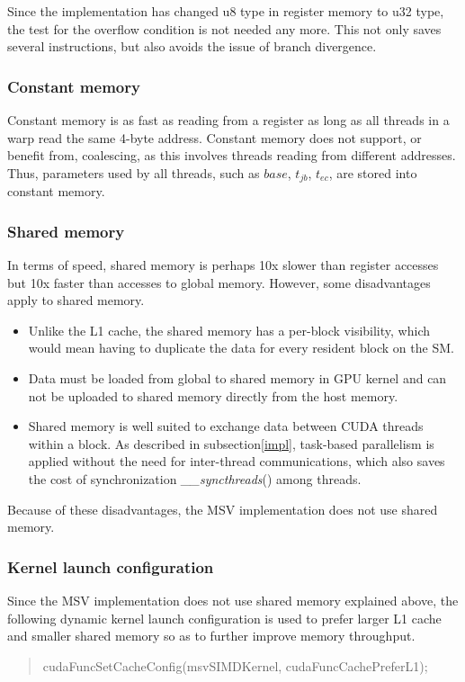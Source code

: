 Since the implementation has changed u8 type in register memory to u32 type, the test for the overflow condition is not needed any more. This not only saves several instructions, but also avoids the issue of branch divergence.

\subsubsection*{Constant memory}
\label{constant}
Constant memory is as fast as reading from a register as long as all threads in a warp read the same 4-byte address. Constant memory does not support, or benefit from, coalescing, as this involves threads reading from different addresses. Thus, parameters used by all threads, such as $base$, $t_{jb}$, $t_{ec}$, are stored into constant memory.

\subsubsection*{Shared memory}
\label{shared}
In terms of speed, shared memory is perhaps 10x slower than register accesses but 10x faster than accesses to global memory. However, some disadvantages apply to shared memory.

\begin{itemize}
 \item Unlike the L1 cache, the shared memory has a per-block visibility, which would mean having to duplicate the data for every resident block on the SM.
 \item Data must be loaded from global to shared memory in GPU kernel and can not be uploaded to shared memory directly from the host memory.
 \item Shared memory is well suited to exchange data between CUDA threads within a block. As described in subsection\ref{impl}, task-based parallelism is applied without the need for inter-thread communications, which also saves the cost of synchronization \emph{\_\_syncthreads}() among threads.
\end{itemize}

Because of these disadvantages, the MSV implementation does not use shared memory.

\subsubsection*{Kernel launch configuration}
\label{launch}
Since the MSV implementation does not use shared memory explained above, the following dynamic kernel launch configuration is used to prefer larger L1 cache and smaller shared memory so as to further improve memory throughput.
\begin{quote}
\selectfont
 cudaFuncSetCacheConfig(msvSIMDKernel, cudaFuncCachePreferL1);
\end{quote}

